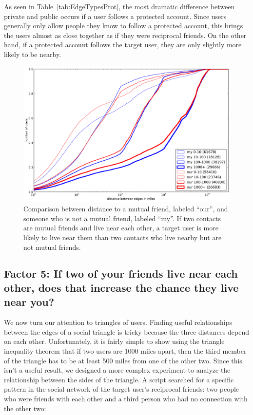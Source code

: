 \documentclass{sig-alternate}
\begin{document}
As seen in Table~\ref{tab:EdgeTypesProt}, the most dramatic difference between
private and public occurs if a user follows a protected account.
%
Since users generally only allow people they know to follow a protected
account, this brings the users almost as close together as if they were
reciprocal friends.
%
On the other hand, if a protected account follows the target user, they
are only slightly more likely to be nearby.

\begin{figure}[tb]
\centering
\includegraphics[width=.9\linewidth]{figures/near_triads.pdf}
\caption{
Comparison between distance to a mutual friend, labeled ``our'', and someone
who is not a mutual friend, labeled ``my''.
If two contacts are mutual friends and live near each other, a target user is
more likely to live near them than two contacts who live nearby but are not
mutual friends.
}
\label{fig:NearTriads}
\vspace{-2pt}
\end{figure}

\subsection{Factor 5: If two of your friends live near each other, does that increase the
chance they live near you?}

We now turn our attention to triangles of users.
%
Finding useful relationships between the edges of a social triangle is tricky
because the three distances depend on each other.
%
Unfortunately, it is fairly simple to show using the triangle inequality theorem
that if two users are 1000 miles apart, then the third member of the triangle
has to be at least 500 miles from one of the other two.
Since this isn't a useful result, we designed a more complex experiment to
analyze the relationship between the sides of the triangle.
A script searched for a specific pattern in the social network of
the target user's reciprocal friends: two people who were friends with each
other and a third person who had no connection with the other two:
\end{document}
